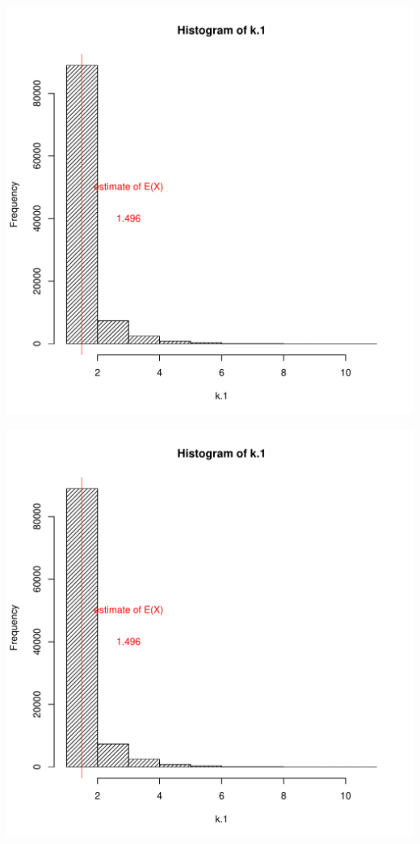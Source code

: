 \documentclass[a4paper, 11pt]{article}
\begin{document}
\begin{center}
  \includegraphics[scale=0.7,page=2]{Rplots.pdf}
\end{center}
\begin{center}
  \includegraphics[scale=0.7,page=3]{Rplots.pdf}
\end{center}
\end{document}
